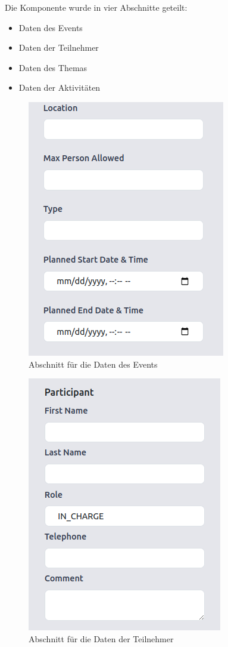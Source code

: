 Die Komponente wurde in vier Abschnitte geteilt:

\begin{itemize}
    \item Daten des Events
    \item Daten der Teilnehmer 
    \item Daten des Themas
    \item Daten der Aktivitäten
\end{itemize}

\begin{figure}[h]
    \centering
    \includegraphics[scale=0.35]{pics/create-event.png}
    \caption{Abschnitt für die Daten des Events}
    \label{lst:event}
\end{figure}

\begin{figure}[h]
    \centering
    \includegraphics[scale=0.35]{pics/add-participant.png}
    \caption{Abschnitt für die Daten der Teilnehmer}    
    \label{lst:participant}
\end{figure}

